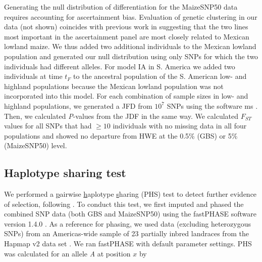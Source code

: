 Generating the null distribution of differentiation for the MaizeSNP50 data requires accounting for ascertainment bias. 
Evaluation of genetic clustering in our data (not shown) coincides with previous work \cite[]{Hufford_2012_22660546} in suggesting that the two lines most important in the ascertainment panel are most closely related to Mexican lowland maize.  
We thus added two additional individuals to the Mexican lowland population and generated our null distribution using only SNPs for which the two individuals had different alleles.
For model IA in S. America we added two individuals at time $t_F$ to the ancestral population of the S. American low- and highland populations because the Mexican lowland population was not incorporated into this model. 
For each combination of sample sizes in low- and highland populations, we generated a JFD from $10^7$  SNPs using the software {\sf ms} \cite[]{Hudson_2002_11847089}.
Then, we calculated \emph{P}-values from the JDF in the same way.
We calculated $F_{ST}$ values for all SNPs that had $\geq10$ individuals with no missing data in all four populations and showed no departure from HWE at the 0.5\% (GBS) or 5\% (MaizeSNP50) level. 



\subsection*{Haplotype sharing test}
We performed a \underline{p}airwise \underline{h}aplotype \underline{s}haring (PHS) test to detect further evidence of selection, following \cite{Toomajian_2006_16623598}.  
To conduct this test, we first imputed and phased the combined SNP data (both GBS and MaizeSNP50) using the {\sf fastPHASE} software version 1.4.0 \cite[]{Scheet_2006_16532393}.  
As a reference for phasing, we used data (excluding heterozygous SNPs) from an Americas-wide sample of 23 partially inbred landraces from the Hapmap v2 data set  \cite[]{Chia_2012_22660545}.  
We ran {\sf fastPHASE}  with default parameter settings.  
PHS was calculated for an allele \emph{A} at position $x$ by

